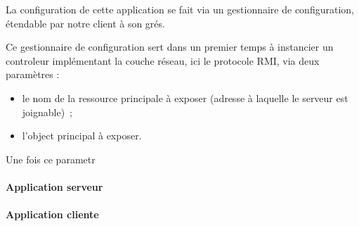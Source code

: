 La configuration de cette application se fait via un gestionnaire de configuration, étendable par notre client à son grés.


Ce gestionnaire de configuration sert dans un premier temps à instancier un controleur implémentant la couche réseau, ici le protocole RMI, via deux paramètres :
\begin{itemize}
 \item le nom de la ressource principale à exposer (adresse à laquelle le serveur est joignable)~;
 \item l'object principal à exposer.
\end{itemize}

Une fois ce parametr


\paragraph{Application serveur}
\paragraph{Application cliente}
